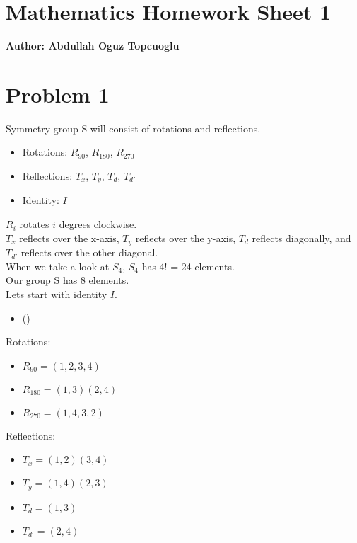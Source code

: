 \documentclass{article}
\begin{document}
\section*{\huge Mathematics Homework Sheet 1}
\begin{flushright}
   \textbf{Author: Abdullah Oguz Topcuoglu}
\end{flushright}

\section*{Problem 1}
Symmetry group S will consist of rotations and reflections.
\begin{itemize}
    \item Rotations: $R_{90}$, $R_{180}$, $R_{270}$
    \item Reflections: $T_x$, $T_y$, $T_d$, $T_{d'}$
    \item Identity: $I$
\end{itemize}

\begin{center}
\end{center}

$R_{i}$ rotates $i$ degrees clockwise. \\
$T_x$ reflects over the x-axis, $T_y$ reflects over the y-axis, $T_d$ reflects diagonally, and $T_{d'}$ reflects over the other diagonal.
\\
When we take a look at $S_4$, $S_4$ has 4! = 24 elements. \\
Our group S has 8 elements. \\
Lets start with identity $I$.
\begin{itemize}
   \item ()
\end{itemize}
Rotations:
\begin{itemize}
   \item $R_{90} = (1, 2, 3, 4)$
   \item $R_{180} = (1,3)(2,4)$
   \item $R_{270} = (1,4,3,2)$
\end{itemize}
Reflections:
\begin{itemize}
   \item $T_x = (1,2)(3,4)$
   \item $T_y = (1,4)(2,3)$
   \item $T_d = (1,3)$
   \item $T_{d'} = (2,4)$
\end{itemize}
\end{document}
